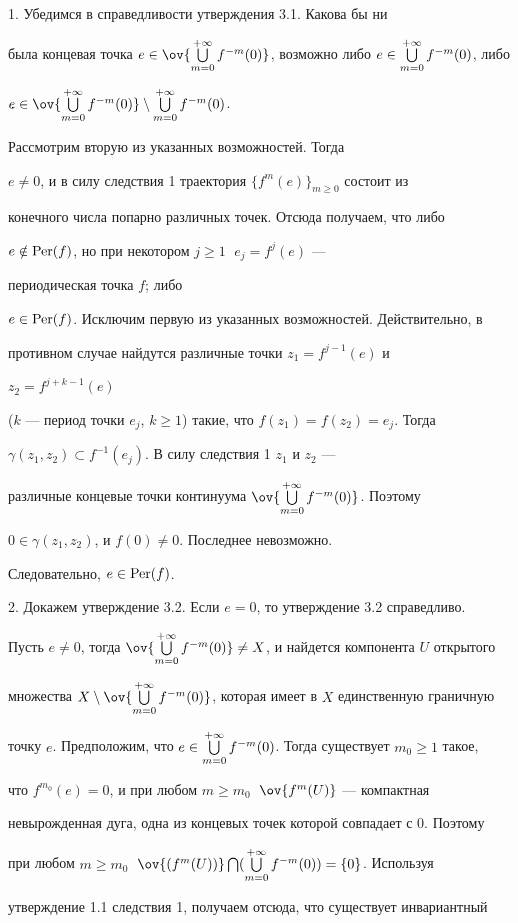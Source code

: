 \begin{pf} 1. Убедимся в справедливости утверждения 3.1. Какова бы ни


была концевая точка $e\in \ov{\ty }$, возможно либо $e\in \bigcup\limits_{m=0}^{+\infty}f^{-m}(0)$, либо


$e\in \ov{\ty}\setminus \ty$.


Рассмотрим вторую из указанных возможностей. Тогда


$e\ne 0$, и в силу следствия 1 траектория $\{f^m(e)\}_{m\ge 0}$ состоит из


конечного числа попарно различных точек. Отсюда получаем, что либо


$e\notin\operatorname{Per}(f)$, но при некотором $j\ge 1\;$ $e_j=f^j(e)$ ---


периодическая точка $f$; либо


$e\in\operatorname{Per}(f)$. Исключим первую из указанных возможностей. Действительно, в


противном случае найдутся различные точки $z_1=f^{j-1}(e)$ и


$z_2=f^{j+k-1}(e)$


($k$ --- период точки $e_j$, $k\ge 1$) такие, что $f(z_1)=f(z_2)=e_j$. Тогда


$\gamma (z_1,z_2)\subset f^{-1}(e_j)$. В силу следствия 1 $z_1$ и $z_2$ ---


различные концевые точки континуума $\ov{\ty}$. Поэтому


$0\in \gamma(z_1,z_2)$, и $f(0)\ne 0$. Последнее невозможно.


Следовательно, $e\in\operatorname{Per}(f)$.


\medskip





2. Докажем утверждение 3.2. Если $e=0$, то утверждение 3.2 справедливо.


Пусть $e\ne 0$, тогда $\ov{\ty} \ne X$, и найдется компонента $U$ открытого


множества $X\setminus \ov{\ty}$, которая имеет в $X$ единственную граничную


точку $e$. Предположим, что $e\in \bigcup\limits_{m=0}^{+\infty}f^{-m}(0) $. Тогда существует $m_0\ge 1$ такое,


что $f^{m_0}(e)=0$, и при любом $m\ge m_0\;$ $\ov{f^m(U)}$ --- компактная


невырожденная дуга, одна из концевых точек которой совпадает с 0. Поэтому


при любом $m\ge m_0\;$ $\ov{(f^m(U))}\bigcap (\ty )=\{0\}$. Используя


утверждение 1.1 следствия 1, получаем отсюда, что существует инвариантный



\end{pf}
